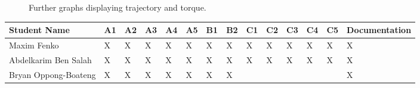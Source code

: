 \begin{figure}[H]
  \caption{Further graphs displaying trajectory and torque.}
    \label{fig:Proj3_tau_xd}
\end{figure}


\begin{table}[h]
    \centering
    \begin{tabular}{ |p{3cm}|p{0.5cm}|p{0.5cm}|p{0.5cm}|p{0.5cm}|p{0.5cm}|p{0.5cm}|p{0.5cm}|p{0.5cm}|p{0.5cm}|p{0.5cm}|p{0.5cm}|p{0.5cm}|p{2.5cm}|  } 
        \hline
       Student Name  & A1 & A2 &A3 & A4&A5&B1&B2&C1&C2&C3&C4&C5&Documentation\\
        \hline
       Maxim Fenko  & X & X &X & X& X & X & X & X &X&X&X&X&X\\
        \hline
       Abdelkarim Ben Salah  & X & X & X& X& X& X& X&X & X&X&X&X&X\\
        \hline
        Bryan Oppong-Boateng  & X& X& X& X & X&X &X & &&&&&X\\
        \hline
    \end{tabular}
    \label{Table:MotorSignals}
\end{table}

